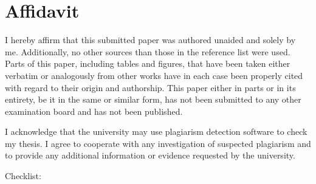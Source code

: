 \documentclass[
  man,
  floatsintext,
  longtable,
  nolmodern,
  notxfonts,
  notimes,
  colorlinks=true,linkcolor=blue,citecolor=blue,urlcolor=blue]{apa7}
\begin{document}
\section{Affidavit}\label{affidavit}

I hereby affirm that this submitted paper was authored unaided and
solely by me. Additionally, no other sources than those in the reference
list were used. Parts of this paper, including tables and figures, that
have been taken either verbatim or analogously from other works have in
each case been properly cited with regard to their origin and
authorship. This paper either in parts or in its entirety, be it in the
same or similar form, has not been submitted to any other examination
board and has not been published.

I acknowledge that the university may use plagiarism detection software
to check my thesis. I agree to cooperate with any investigation of
suspected plagiarism and to provide any additional information or
evidence requested by the university.

Checklist:
\end{document}
